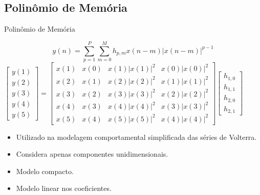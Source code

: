 \documentclass{if-beamer}
\begin{document}
\subsection{Polinômio de Memória}
\begin{frame}{Polinômio de Memória}
	\begin{minipage}{0.6\textwidth}
		\raggedleft
		\scriptsize
		\begin{equation}
			y(n) = \sum_{p=1}^{P} \sum_{m=0}^{M} h_{p,m} x(n-m) |x(n-m)|^{p-1}
		\end{equation}
		$
		\begin{bmatrix}
			y(1) \\
			y(2) \\
			y(3) \\
			y(4) \\
			y(5)
		\end{bmatrix}
		=
		\begin{bmatrix}
			x(1) & x(0) & x(1)\lvert x(1) \rvert ^2 & x(0)\lvert x(0) \rvert^2  \\ 
			x(2) & x(1) & x(2)\lvert x(2) \rvert ^2 & x(1)\lvert x(1) \rvert^2  \\ 
			x(3) & x(2) & x(3)\lvert x(3) \rvert ^2 & x(2)\lvert x(2) \rvert^2 \\ 
			x(4) & x(3) & x(4)\lvert x(4) \rvert ^2 & x(3)\lvert x(3) \rvert^2  \\ 
			x(5) & x(4) & x(5)\lvert x(5) \rvert ^2 & x(4)\lvert x(4) \rvert^2 
		\end{bmatrix}
		\begin{bmatrix}
			h_{1,0} \\
			h_{1,1} \\
			h_{2,0} \\
			h_{2,1}
		\end{bmatrix}
		$
		
		
		
	\end{minipage}%
	\hspace{0.1\textwidth}
	\begin{minipage}{0.4\textwidth}
		\begin{itemize}
			\item Utilizado na modelagem comportamental simplificada das séries de Volterra.
			\item Considera apenas componentes unidimensionais.
			\item Modelo compacto.
			\item Modelo linear nos coeficientes.
		\end{itemize}
	\end{minipage}
\end{frame}
\end{document}
